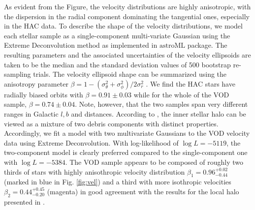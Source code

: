\documentclass[fleqn,usenatbib]{mnras}
\begin{document}
As evident from the Figure, the velocity distributions are highly
anisotropic, with the dispersion in the radial component dominating
the tangential ones, especially in the HAC data. To describe the shape
of the velocity distributions, we model each stellar sample as a
single-component multi-variate Gaussian using the Extreme
Deconvolution \citep{ED} method as implemented in $\mathrm{astroML}$
\citep{astroML} package. The resulting parameters and the associated
uncertainties of the velocity ellipsoids are taken to be the median
and the standard deviation values of 500 bootstrap re-sampling trials.
The velocity ellipsoid shape can be summarized using the anisotropy
parameter $\beta=1-(\sigma^2_{\theta}+\sigma^2_{\phi})/2\sigma^2_r$
\citep[see][]{Binney2008}. We find the HAC stars have radially biased
orbits with $\beta = 0.91 \pm 0.03$ while for the whole of the VOD
sample, $\beta = 0.74 \pm 0.04$. Note, however, that the two samples
span very different ranges in Galactic $l,b$ and distances. According
to \citet{Belokurov2018}, the inner stellar halo can be viewed as a
mixture of two debris components with distinct
properties. Accordingly, we fit a model with two multivariate
Gaussians to the VOD velocity data using Extreme Deconvolution. 
With log-likelihood of $\log L = -5119$, the
two-component model is clearly preferred compared to the
single-component one with $\log L = -5384$. The VOD sample appears to
be composed of roughly two thirds of stars with highly anisothropic
velocity distribution $\beta_{1}=
0.96^{+0.02}_{-0.44}$ (marked in blue in Fig. \ref{fig:vel}) and a
third with more isothropic velocities $\beta_{2}=0.44^{+0.45}_{-0.20}$ (magenta) in good
agreement with the results for the local halo presented in
\citet{Belokurov2018}.
%
\end{document}
